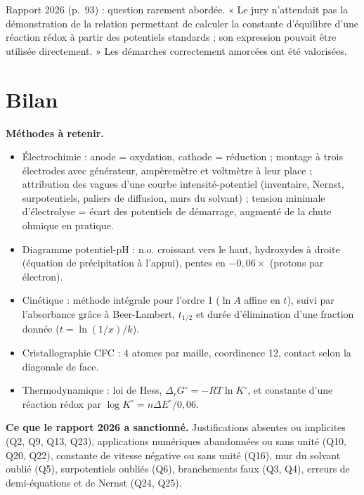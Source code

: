 \documentclass[11pt,a4paper]{article}
\providecommand{\tightlist}{\setlength{\itemsep}{0pt}\setlength{\parskip}{0pt}}
\begin{document}
\begin{jury}

Rapport 2026 (p.~93) : question rarement abordée. « Le jury n'attendait pas la démonstration de la relation permettant de calculer la constante d'équilibre d'une réaction rédox à partir des potentiels standards ; son expression pouvait être utilisée directement. » Les démarches correctement amorcées ont été valorisées.

\end{jury}

\hypertarget{bilan}{%
\section{Bilan}\label{bilan}}

\textbf{Méthodes à retenir.}

\begin{itemize}
\tightlist
\item
  Électrochimie : anode = oxydation, cathode = réduction ; montage à trois électrodes avec générateur, ampèremètre et voltmètre à leur place ; attribution des vagues d'une courbe intensité-potentiel (inventaire, Nernst, surpotentiels, paliers de diffusion, murs du solvant) ; tension minimale d'électrolyse = écart des potentiels de démarrage, augmenté de la chute ohmique en pratique.
\item
  Diagramme potentiel-pH : n.o. croissant vers le haut, hydroxydes à droite (équation de précipitation à l'appui), pentes en \(-0{,}06\times\) (protons par électron).
\item
  Cinétique : méthode intégrale pour l'ordre 1 (\(\ln A\) affine en \(t\)), suivi par l'absorbance grâce à Beer-Lambert, \(t_{1/2}\) et durée d'élimination d'une fraction donnée (\(t=\ln(1/x)/k\)).
\item
  Cristallographie CFC : 4 atomes par maille, coordinence 12, contact selon la diagonale de face.
\item
  Thermodynamique : loi de Hess, \(\Delta_rG^\circ=-RT\ln K^\circ\), et constante d'une réaction rédox par \(\log K^\circ=n\Delta E^\circ/0{,}06\).
\end{itemize}

\textbf{Ce que le rapport 2026 a sanctionné.} Justifications absentes ou implicites (Q2, Q9, Q13, Q23), applications numériques abandonnées ou sans unité (Q10, Q20, Q22), constante de vitesse négative ou sans unité (Q16), mur du solvant oublié (Q5), surpotentiels oubliés (Q6), branchements faux (Q3, Q4), erreurs de demi-équations et de Nernst (Q24, Q25).
\end{document}

